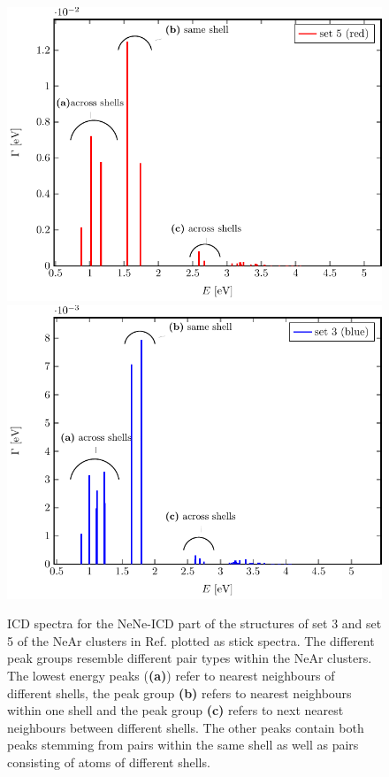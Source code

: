 \begin{figure}[h]
 \centering
 \includegraphics[width=\columnwidth]{pics/rot.pdf}\\
 \includegraphics[width=\columnwidth]{pics/blue.pdf}
 \caption{ICD spectra for the NeNe-ICD part of the structures of set 3 and
          set 5 of the NeAr clusters in Ref. \cite{Fasshauer14_1}
          plotted as stick spectra.
          The different peak groups resemble different pair types
          within the NeAr clusters. The lowest energy peaks (\textbf{(a)})
          refer to nearest neighbours
          of different shells, the peak group \textbf{(b)} refers
          to nearest neighbours within one shell and the peak group \textbf{(c)}
          refers to next nearest neighbours between different shells.
          The other peaks contain both peaks stemming from
          pairs within the same shell as well as pairs consisting of atoms
          of different shells.}
 \label{figure:rot_blue}
\end{figure}

